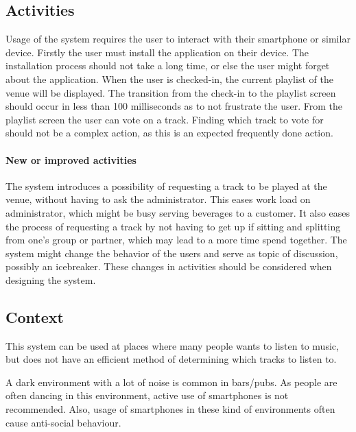 \subsection{Activities}
\label{sub:pact_activities}

Usage of the system requires the user to interact with their smartphone or similar device. Firstly the user must install the application on their device. The installation process should not take a long time, or else the user might forget about the application. When the user is checked-in, the current playlist of the venue will be displayed. The transition from the check-in to the playlist screen should occur in less than 100 milliseconds as to not frustrate the user. From the playlist screen the user can vote on a track. Finding which track to vote for should not be a complex action, as this is an expected frequently done action. 

\paragraph{New or improved activities}
The system introduces a possibility of requesting a track to be played at the venue, without having to ask the administrator. This eases work load on administrator, which might be busy serving beverages to a customer. It also eases the process of requesting a track by not having to get up if sitting and splitting from one's group or partner, which may lead to a more time spend together. The system might change the behavior of the users and serve as topic of discussion, possibly an icebreaker. These changes in activities should be considered when designing the system.

\subsection{Context}
\label{sub:pact_context}

This system can be used at places where many people wants to listen to music, but does not have an efficient method  of determining which tracks to listen to.

A dark environment with a lot of noise is common in bars/pubs. As people are often dancing in this environment, active use of smartphones is not recommended. Also, usage of smartphones in these kind of environments often cause anti-social behaviour. 

